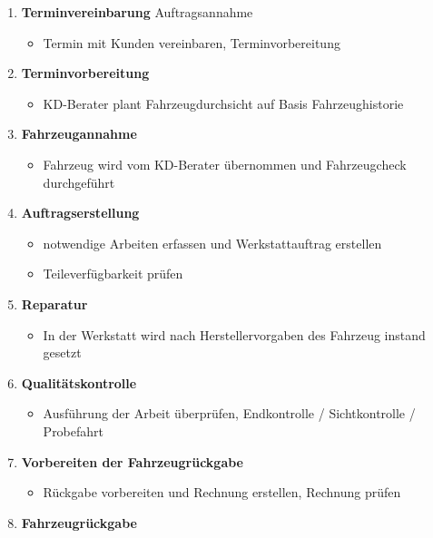 \begin{enumerate}
\item
  \textbf{Terminvereinbarung} Auftragsannahme

  \begin{itemize}
  \item
    Termin mit Kunden vereinbaren, Terminvorbereitung
  \end{itemize}
\item
  \textbf{Terminvorbereitung}

  \begin{itemize}
  \item
    KD-Berater plant Fahrzeugdurchsicht auf Basis Fahrzeughistorie
  \end{itemize}
\item
  \textbf{Fahrzeugannahme}

  \begin{itemize}
  \item
    Fahrzeug wird vom KD-Berater übernommen und Fahrzeugcheck
    durchgeführt
  \end{itemize}
\item
  \textbf{Auftragserstellung}

  \begin{itemize}
  \item
    notwendige Arbeiten erfassen und Werkstattauftrag erstellen
  \item
    Teileverfügbarkeit prüfen
  \end{itemize}
\item
  \textbf{Reparatur}

  \begin{itemize}
  \item
    In der Werkstatt wird nach Herstellervorgaben des Fahrzeug instand
    gesetzt
  \end{itemize}
\item
  \textbf{Qualitätskontrolle}

  \begin{itemize}
  \item
    Ausführung der Arbeit überprüfen, Endkontrolle / Sichtkontrolle /
    Probefahrt
  \end{itemize}
\item
  \textbf{Vorbereiten der Fahrzeugrückgabe}

  \begin{itemize}
  \item
    Rückgabe vorbereiten und Rechnung erstellen, Rechnung prüfen
  \end{itemize}
\item
  \textbf{Fahrzeugrückgabe}


\end{enumerate}
